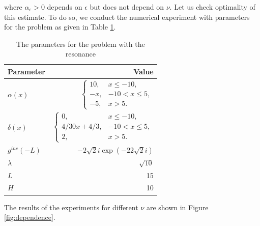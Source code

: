 where $\alpha_{\epsilon}>0$ depends on $\epsilon$ but does not depend on $\nu$. Let us check optimality of this estimate.  
To do so, we conduct the  numerical experiment with parameters for the problem as given in Table \ref{tab:parameters}.
\begin{table}
\begin{tabular}{l|r}
Parameter & Value \\
\hline
$\alpha(x)$ & $\left\{\begin{array}{cc}
10, & x\leq -10,\\
-x, & -10<x\leq 5,\\
-5, & x>5.
\end{array}\right.$ \\
$\delta(x)$ & 
$\left\{\begin{array}{cc}
0, & x\leq -10,\\
4/30x+4/3,& -10<x\leq 5,\\
2, & x>5.
\end{array}\right.$ \\
$g^{inc}(-L)$ & $-2 \sqrt{2}i\exp(-22\sqrt{2}i)$\\
$\lambda$ & 
$\sqrt{10}$\\
$L$& 15\\
$H$ & 10 \\
\end{tabular}
\caption{The parameters for the problem with the resonance}
\label{tab:parameters}
\end{table}
The results of the experiments for different $\nu$ are shown in Figure \ref{fig:dependence}. 

